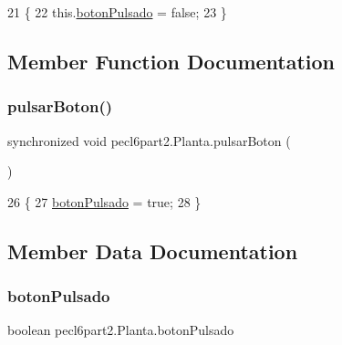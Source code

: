 \begin{DoxyCode}
21     \{
22         this.\mbox{\hyperlink{classpecl6part2_1_1_planta_a6c974e390e1529f4843495bc1b19495b}{botonPulsado}} = \textcolor{keyword}{false};
23     \}
\end{DoxyCode}


\subsection{Member Function Documentation}
\mbox{\label{classpecl6part2_1_1_planta_a09569038a4c6626b58213853f0c58f06}} 
\subsubsection{\texorpdfstring{pulsar\+Boton()}{pulsarBoton()}}
{\footnotesize\ttfamily synchronized void pecl6part2.\+Planta.\+pulsar\+Boton (\begin{DoxyParamCaption}{ }\end{DoxyParamCaption})\hspace{0.3cm}{\ttfamily [inline]}}


\begin{DoxyCode}
26     \{
27         \mbox{\hyperlink{classpecl6part2_1_1_planta_a6c974e390e1529f4843495bc1b19495b}{botonPulsado}} = \textcolor{keyword}{true};
28     \}
\end{DoxyCode}


\subsection{Member Data Documentation}
\mbox{\label{classpecl6part2_1_1_planta_a6c974e390e1529f4843495bc1b19495b}} 
\subsubsection{\texorpdfstring{boton\+Pulsado}{botonPulsado}}
{\footnotesize\ttfamily boolean pecl6part2.\+Planta.\+boton\+Pulsado}

